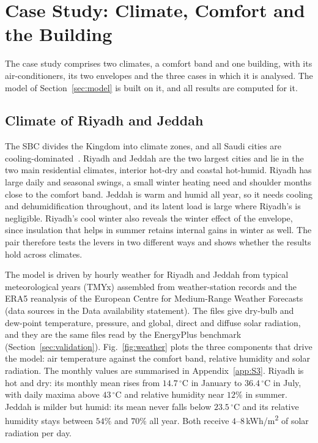 \documentclass[10pt,a4paper,twocolumn]{article}
\theoremstyle{definition}
\begin{document}
\section{Case Study: Climate, Comfort and the Building}\label{sec:context}
The case study comprises two climates, a comfort band and one building, with its air-conditioners, its two envelopes and the three cases in which it is analysed. The model of Section~\ref{sec:model} is built on it, and all results are computed for it.

\subsection{Climate of Riyadh and Jeddah}\label{sec:weather}
The SBC divides the Kingdom into climate zones, and all Saudi cities are cooling-dominated~\citep{alayed2021thermal,stockmodel2020}. Riyadh and Jeddah are the two largest cities and lie in the two main residential climates, interior hot-dry and coastal hot-humid. Riyadh has large daily and seasonal swings, a small winter heating need and shoulder months close to the comfort band. Jeddah is warm and humid all year, so it needs cooling and dehumidification throughout, and its latent load is large where Riyadh's is negligible. Riyadh's cool winter also reveals the winter effect of the envelope, since insulation that helps in summer retains internal gains in winter as well. The pair therefore tests the levers in two different ways and shows whether the results hold across climates.

The model is driven by hourly weather for Riyadh and Jeddah from typical meteorological years (TMYx) assembled from weather-station records and the ERA5 reanalysis of the European Centre for Medium-Range Weather Forecasts (data sources in the Data availability statement). The files give dry-bulb and dew-point temperature, pressure, and global, direct and diffuse solar radiation, and they are the same files read by the EnergyPlus benchmark (Section~\ref{sec:validation}). Fig.~\ref{fig:weather} plots the three components that drive the model: air temperature against the comfort band, relative humidity and solar radiation. The monthly values are summarised in Appendix~\ref{app:S3}. Riyadh is hot and dry: its monthly mean rises from $14.7\,^{\circ}$C in January to $36.4\,^{\circ}$C in July, with daily maxima above $43\,^{\circ}$C and relative humidity near $12\%$ in summer. Jeddah is milder but humid: its mean never falls below $23.5\,^{\circ}$C and its relative humidity stays between $54\%$ and $70\%$ all year. Both receive $4$--$8\,$kWh/m\textsuperscript{2} of solar radiation per day.
\end{document}
